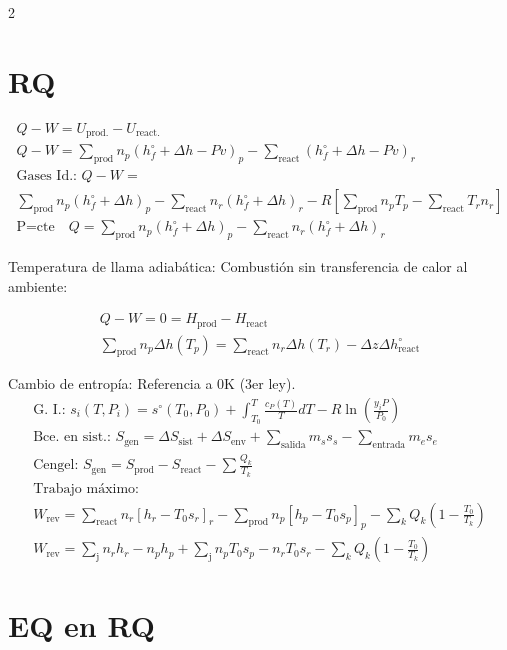 \documentclass[9pt]{article}
\begin{document}
\begin{multicols}{2}
\section{RQ}
\begin{gather*}
  Q - W = U_\text{prod.} - U_\text{react.}\\
  Q - W = \sum_\text{prod} n_p (h_f^\circ + \Delta h - Pv)_p - \sum_\text{react}(h_f^\circ + \Delta h- Pv)_r\\
  \text{Gases Id.: } Q - W =\\
  \sum_\text{prod} n_p (h_f^\circ + \Delta h )_p - \sum_\text{react}n_r(h_f^\circ + \Delta h)_r - R\left[\sum_\text{prod} n_p T_p - \sum_\text{react}T_r n_r \right]\\
  \text{P=cte} \quad Q = \sum_\text{prod} n_p (h_f^\circ + \Delta h )_p - \sum_\text{react}n_r(h_f^\circ + \Delta h)_r 
\end{gather*}

Temperatura de llama adiabática: Combustión sin transferencia de calor al ambiente:

\begin{gather*}
  Q - W = 0 = H_\text{prod} - H_\text{react}\\
  \sum_\text{prod} n_p \Delta h(T_p) = \sum_\text{react} n_r \Delta h(T_r) - \Delta z \Delta h_\text{react}^\circ
\end{gather*}

Cambio de entropía: Referencia a 0K (3er ley).
\begin{gather*}
  \text{G. I.: } s_i(T,P_i) = s^\circ(T_0,P_0)+ \int_{T_0}^{T}\frac{c_P(T)}{T}dT - R \ln(\frac{y_i P}{P_0})\\
  \text{Bce. en sist.: } S_\text{gen} = \Delta S_\text{sist} + \Delta S_\text{env} + \sum_\text{salida}m_s s_s - \sum_\text{entrada} m_e s_e\\
  \text{Cengel: } S_\text{gen} = S_\text{prod} - S_\text{react} - \sum\frac{Q_k}{T_k}\\
  \text{Trabajo máximo:}\\
  W_\text{rev} = \sum_\text{react} n_r [h_r -T_0 s_r]_r - \sum_\text{prod} n_p [h_p -T_0 s_p]_p - \sum_k Q_k \left(1-\frac{T_0}{T_k}\right)\\
  W_\text{rev} = \sum_\text{j} n_r h_r-  n_p h_p +\sum_\text{j} n_p T_0 s_p- n_r T_0 s_r - \sum_k Q_k \left(1-\frac{T_0}{T_k}\right)
\end{gather*}

\clearpage

\section{EQ en RQ}


\end{multicols}
\end{document}
